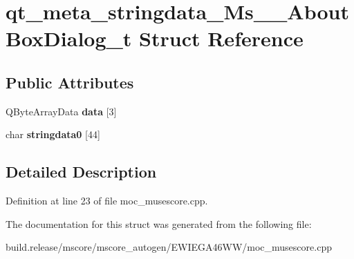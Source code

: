 \hypertarget{structqt__meta__stringdata___ms_____about_box_dialog__t}{}\section{qt\+\_\+meta\+\_\+stringdata\+\_\+\+Ms\+\_\+\+\_\+\+About\+Box\+Dialog\+\_\+t Struct Reference}
\label{structqt__meta__stringdata___ms_____about_box_dialog__t}
\subsection*{Public Attributes}
\begin{DoxyCompactItemize}
\item 
\mbox{\label{structqt__meta__stringdata___ms_____about_box_dialog__t_add72b12854b94e7d2cdf706f84bd6dc7}} 
Q\+Byte\+Array\+Data {\bfseries data} \mbox{[}3\mbox{]}
\item 
\mbox{\label{structqt__meta__stringdata___ms_____about_box_dialog__t_a0f45f3a9ca456db27ed8446e4e591332}} 
char {\bfseries stringdata0} \mbox{[}44\mbox{]}
\end{DoxyCompactItemize}


\subsection{Detailed Description}


Definition at line 23 of file moc\+\_\+musescore.\+cpp.



The documentation for this struct was generated from the following file\+:\begin{DoxyCompactItemize}
\item 
build.\+release/mscore/mscore\+\_\+autogen/\+E\+W\+I\+E\+G\+A46\+W\+W/moc\+\_\+musescore.\+cpp\end{DoxyCompactItemize}
